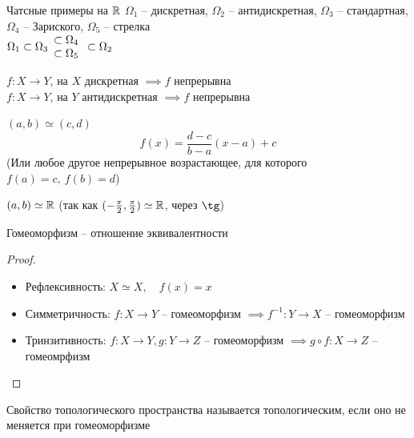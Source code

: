 \begin{undefthm}{Чатсные примеры на $\mathbb{R}$}
    $ \Omega_1 $ -- дискретная, $ \Omega_2 $ -- антидискретная, $ \Omega_3 $ -- стандартная, $ \Omega_4 $ -- Зариского, $ \Omega_5 $ -- стрелка \\
    $ \Omega_1 \subset \Omega_3
    \begin{array}{c}
    	\subset \Omega_4 \\
        \subset \Omega_5
    \end{array} \subset \Omega_2 $
\end{undefthm}

\begin{note}
	$ f : X \to Y $, на $ X $ дискретная $ \implies f $ непрерывна \\
    $ f : X \to Y $, на $ Y $ антидискретная $ \implies f $ непрерывна
\end{note}

\begin{exmpls}
	\item $ (a, b) \simeq (c, d) $
    $$ f(x) = \frac{d - c}{b - a}(x - a) + c $$
    (Или любое другое непрерывное возрастающее, для которого $ f(a) = c, ~ f(b) = d $)
    \item $ (a, b) \simeq \mathbb{R} $ (так как $ (-\frac\pi2, \frac\pi2) \simeq \mathbb{R} $, через $ \tg $)
\end{exmpls}

\begin{statement}
	Гомеоморфизм -- отношение эквивалентности
\end{statement}

\begin{proof}
	\hfill
    \begin{itemize}
    	\item Рефлексивность: $ X \simeq X, \quad f(x) = x $
        \item Симметричность: $ f: X \to Y $ -- гомеоморфизм $ \implies f^{-1} : Y \to X $ -- гомеоморфизм
        \item Тринзитивность: $ f: X \to Y, g : Y \to Z $ -- гомеоморфизм $ \implies g \circ f : X \to Z $ -- гомеомрфизм
    \end{itemize}
\end{proof}

\begin{definition}
	Свойство топологического пространства называется топологическим, если оно не меняется при гомеоморфизме
\end{definition}
